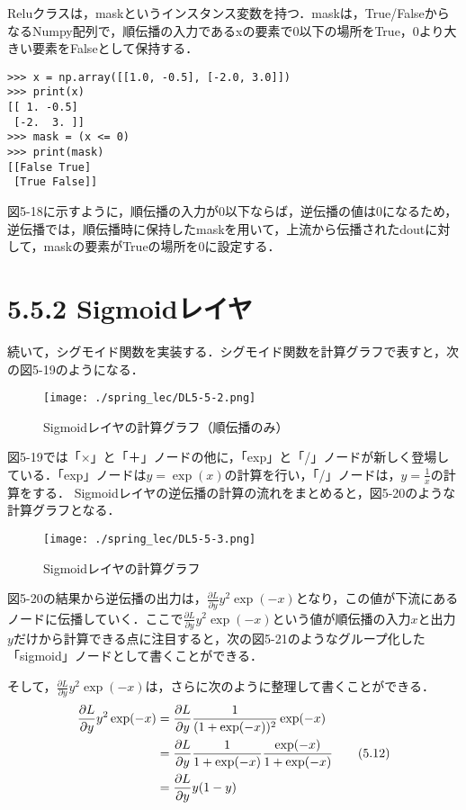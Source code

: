 \documentclass[dvipdfmx]{jsarticle}
\begin{document}
Reluクラスは，maskというインスタンス変数を持つ．maskは，True/FalseからなるNumpy配列で，順伝播の入力であるxの要素で0以下の場所をTrue，0より大きい要素をFalseとして保持する．

\begin{lstlisting}[caption=maskの例, label=fuga]
>>> x = np.array([[1.0, -0.5], [-2.0, 3.0]])
>>> print(x)
[[ 1. -0.5]
 [-2.  3. ]]
>>> mask = (x <= 0)
>>> print(mask)
[[False True]
 [True False]]
\end{lstlisting}

図5-18に示すように，順伝播の入力が0以下ならば，逆伝播の値は0になるため，逆伝播では，順伝播時に保持したmaskを用いて，上流から伝播されたdoutに対して，maskの要素がTrueの場所を0に設定する．

\section*{5.5.2 Sigmoidレイヤ}
続いて，シグモイド関数を実装する．シグモイド関数を計算グラフで表すと，次の図5-19のようになる．

\begin{figure}[H]
\begin{center}
\texttt{[image: ./spring\_lec/DL5-5-2.png]}
\end{center}
\caption{Sigmoidレイヤの計算グラフ（順伝播のみ）}
\end{figure}

図5-19では「×」と「＋」ノードの他に，「exp」と「/」ノードが新しく登場している．「exp」ノードは$y = \exp(x)$の計算を行い，「/」ノードは，$y = \frac{1}{x}$の計算をする．
Sigmoidレイヤの逆伝播の計算の流れをまとめると，図5-20のような計算グラフとなる．

\begin{figure}[H]
\begin{center}
\texttt{[image: ./spring\_lec/DL5-5-3.png]}
\end{center}
\caption{Sigmoidレイヤの計算グラフ}
\end{figure}

図5-20の結果から逆伝播の出力は，$\frac{\partial L}{\partial y} y^2 \exp(-x)$となり，この値が下流にあるノードに伝播していく．ここで$\frac{\partial L}{\partial y} y^2 \exp(-x)$という値が順伝播の入力$x$と出力$y$だけから計算できる点に注目すると，次の図5-21のようなグループ化した「sigmoid」ノードとして書くことができる．

そして，$\frac{\partial L}{\partial y} y^2 \exp(-x)$は，さらに次のように整理して書くことができる．
\begin{align}\label{}
\notag
\frac{\partial L}{\partial y} y^2 \exp(-x) &= \frac{\partial L}{\partial y} \frac{1}{(1 + \exp(-x))^2} \exp(-x) \\
&= \frac{\partial L}{\partial y} \frac{1}{1 + \exp(-x)} \frac{\exp(-x)}{1 + \exp(-x)} \tag{5.12} \\
&= \frac{\partial L}{\partial y} y(1 - y) \notag
\end{align}
\end{document}
